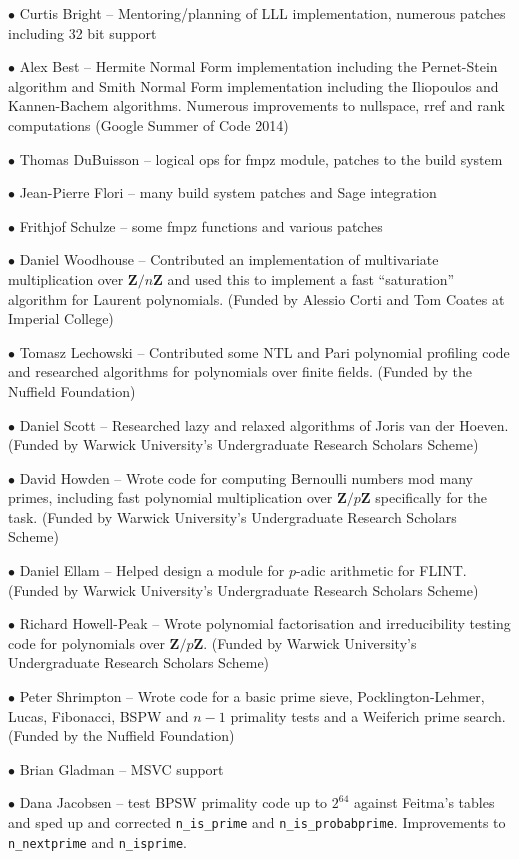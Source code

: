 \documentclass[a4paper,10pt]{book}
\newcommand{\Z}{\mathbf{Z}}%
\newcommand{\code}{\lstinline}
\begin{document}
$\bullet$ Curtis Bright -- Mentoring/planning of LLL implementation, numerous 
patches including 32 bit support

$\bullet$ Alex Best -- Hermite Normal Form implementation including the
Pernet-Stein algorithm and Smith Normal Form implementation including the
Iliopoulos and Kannen-Bachem algorithms. Numerous improvements to nullspace,
rref and rank computations (Google Summer of Code 2014)

$\bullet$ Thomas DuBuisson -- logical ops for fmpz module, patches to the build
system

$\bullet$ Jean-Pierre Flori -- many build system patches and Sage integration

$\bullet$ Frithjof Schulze -- some fmpz functions and various patches

$\bullet$ Daniel Woodhouse -- Contributed an implementation of multivariate
multiplication over $\Z/n\Z$ and used this to implement a fast ``saturation''
algorithm for Laurent polynomials. (Funded by Alessio Corti and Tom Coates
at Imperial College)

$\bullet$ Tomasz Lechowski -- Contributed some NTL and Pari polynomial
profiling code and researched algorithms for polynomials over finite fields.
(Funded by the Nuffield Foundation)

$\bullet$ Daniel Scott -- Researched lazy and relaxed algorithms of Joris van
der Hoeven. (Funded by Warwick University's Undergraduate Research Scholars
Scheme)

$\bullet$ David Howden -- Wrote code for computing Bernoulli numbers mod many
primes, including fast polynomial multiplication over $\Z/p\Z$ specifically for
the task. (Funded by Warwick University's Undergraduate Research Scholars
Scheme)

$\bullet$ Daniel Ellam -- Helped design a module for $p$-adic arithmetic for
FLINT. (Funded by Warwick University's Undergraduate Research Scholars Scheme)

$\bullet$ Richard Howell-Peak -- Wrote polynomial factorisation and
irreducibility testing code for polynomials over $\Z/p\Z$. (Funded by Warwick
University's Undergraduate Research Scholars Scheme)

$\bullet$ Peter Shrimpton -- Wrote code for a basic prime sieve,
Pocklington-Lehmer, Lucas, Fibonacci, BSPW and $n-1$ primality tests and a
Weiferich prime search. (Funded by the Nuffield Foundation)

$\bullet$ Brian Gladman -- MSVC support

$\bullet$ Dana Jacobsen -- test BPSW primality code up to $2^64$ against
Feitma's tables and sped up and corrected \code{n_is_prime} and
\code{n_is_probabprime}. Improvements to \code{n_nextprime} and
\code{n_isprime}.
\end{document}
